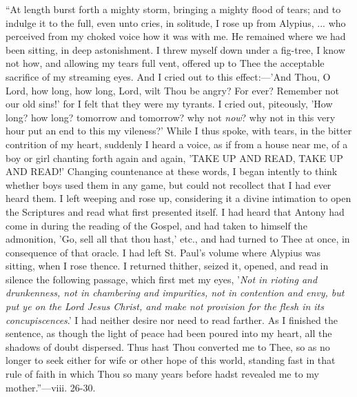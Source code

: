 ``At length burst forth a mighty storm, bringing a mighty flood
of tears; and to indulge it to the full, even unto cries, in solitude,
I rose up from Alypius, ... who perceived from my choked voice how it
was with me. He remained where we had been sitting, in deep
astonishment. I threw myself down under a fig-tree, I know not how,
and allowing my tears full vent, offered up to Thee the acceptable
sacrifice of my streaming eyes. And I cried out to this effect:—'And
Thou, O Lord, how long, how long, Lord, wilt Thou be angry? For ever?
Remember not our old sins!' for I felt that they were my tyrants. I
cried out, piteously, 'How long? how long?
tomorrow and tomorrow? why not \emph{now}? why not in this very hour
put an end to this my vileness?' While I thus spoke, with tears, in
the bitter contrition of my heart, suddenly I heard a voice, as if
from a house near me, of a boy or girl chanting forth again and again,
'TAKE UP AND READ, TAKE UP AND READ!' Changing countenance at these
words, I began intently to think whether boys used them in any game,
but could not recollect that I had ever heard them. I left weeping and
rose up, considering it a divine intimation to open the Scriptures and
read what first presented itself. I had heard that Antony had come in
during the reading of the Gospel, and had taken to himself the
admonition, 'Go, sell all that thou hast,' etc., and had turned to
Thee at once, in consequence of that oracle. I had left St. Paul's
volume where Alypius was sitting, when I rose thence. I returned
thither, seized it, opened, and read in silence the following passage,
which first met my eyes, '\emph{Not in rioting and drunkenness, not in
chambering and impurities, not in contention and envy, but put ye on
the Lord Jesus Christ, and make not provision for the flesh in its
concupiscences}.' I had neither desire nor need to read farther. As
I finished the sentence, as though the light of peace had been poured
into my heart, all the shadows of doubt dispersed. Thus hast Thou
converted me to Thee, so as no longer to seek either for wife or other
hope of this world, standing fast in that rule of faith in which Thou
so many years before hadst revealed me to my mother.''—viii.
26-30.

